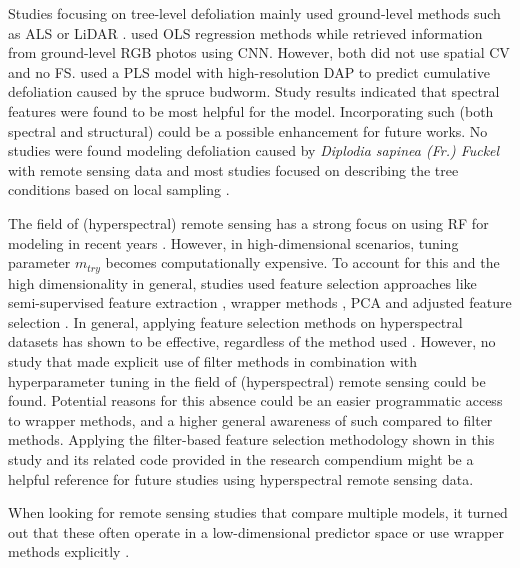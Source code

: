 \documentclass[remotesensing,article,submit,moreauthors,pdftex]{Definitions/mdpi}
\begin{document}
Studies focusing on tree-level defoliation mainly used ground-level methods such as \ac{ALS} or \ac{LiDAR} \cite{meng2018, kalin2019}.
\cite{meng2018} used \ac{OLS} regression methods while \cite{kalin2019} retrieved information from ground-level RGB photos using \ac{CNN}.
However, both did not use spatial \ac{CV} and \cite{kalin2019} no \ac{FS}.
\cite{goodbody2018} used a \ac{PLS} model with high-resolution \ac{DAP} to predict cumulative defoliation caused by the spruce budworm.
Study results indicated that spectral features were found to be most helpful for the model.
Incorporating such (both spectral and structural) could be a possible enhancement for future works.
No studies were found modeling defoliation caused by \textit{Diplodia sapinea (Fr.) Fuckel} with remote sensing data and most studies focused on describing the tree conditions based on local sampling \cite{hlebarska2018, kaya2019}.

The field of (hyperspectral) remote sensing has a strong focus on using RF for modeling in recent years \cite{belgiu2016}.
However, in high-dimensional scenarios, tuning parameter \texttt{\(m_{try}\)} becomes computationally expensive.
To account for this and the high dimensionality in general, studies used feature selection approaches like semi-supervised feature extraction \cite{xia2015}, wrapper methods \cite{fassnacht2014, feng2016, georganos2018}, PCA and adjusted feature selection \cite{rochac2016}.
In general, applying feature selection methods on hyperspectral datasets has shown to be effective, regardless of the method used \cite{pal2010, keller2016}.
However, no study that made explicit use of filter methods in combination with hyperparameter tuning in the field of (hyperspectral) remote sensing could be found.
Potential reasons for this absence could be an easier programmatic access to wrapper methods, and a higher general awareness of such compared to filter methods.
Applying the filter-based feature selection methodology shown in this study and its related code provided in the research compendium might be a helpful reference for future studies using hyperspectral remote sensing data.

When looking for remote sensing studies that compare multiple models, it turned out that these often operate in a low-dimensional predictor space \cite{xu2019} or use wrapper methods explicitly \cite{georganos2018}.
\end{document}
